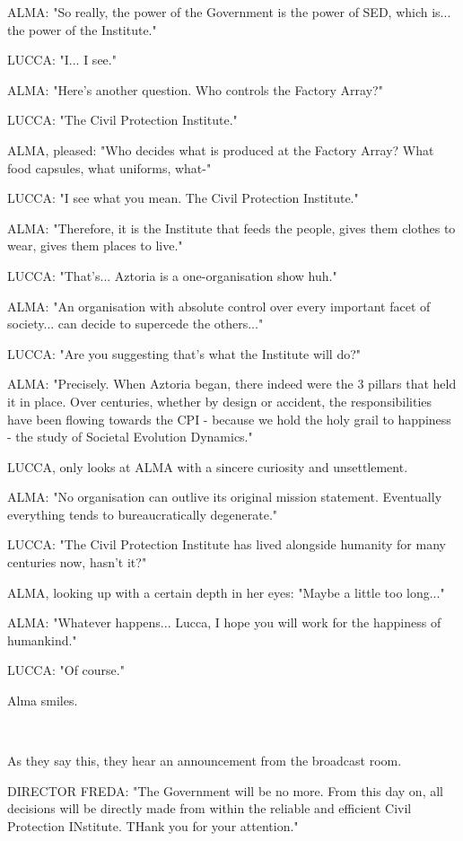 \documentclass[11pt]{article}
\begin{document}
ALMA: "So really, the power of the Government is the power of SED, which is... the power of the Institute."

LUCCA: "I... I see."

ALMA: "Here's another question. 
Who controls the Factory Array?"

LUCCA: "The Civil Protection Institute."

ALMA, pleased: "Who decides what is produced at the Factory Array?
What food capsules, what uniforms, what-"

LUCCA: "I see what you mean. The Civil Protection Institute."

ALMA: "Therefore, it is the Institute that feeds the people, gives them clothes to wear, gives them places to live."

LUCCA: "That's... Aztoria is a one-organisation show huh."

ALMA: "An organisation with absolute control over every important facet of society... can decide to supercede the others..."

LUCCA: "Are you suggesting that's what the Institute will do?"

ALMA: "Precisely.
When Aztoria began, there indeed were the 3 pillars that held it in place. 
Over centuries, whether by design or accident, the responsibilities have been flowing towards the CPI - because we hold the holy grail to happiness - the study of Societal Evolution Dynamics."

LUCCA, only looks at ALMA with a sincere curiosity and unsettlement.

ALMA: "No organisation can outlive its original mission statement. Eventually everything tends to bureaucratically degenerate."

LUCCA: "The Civil Protection Institute has lived alongside humanity for many centuries now, hasn't it?"

ALMA, looking up with a certain depth in her eyes: "Maybe a little too long..."

ALMA: "Whatever happens...
Lucca, I hope you will work for the happiness of humankind."

LUCCA: "Of course."

Alma smiles.

\ 

As they say this, they hear an announcement from the broadcast room.

DIRECTOR FREDA: "The Government will be no more. 
From this day on, all decisions will be directly made from within the reliable and efficient Civil Protection INstitute.
THank you for your attention."
\end{document}
